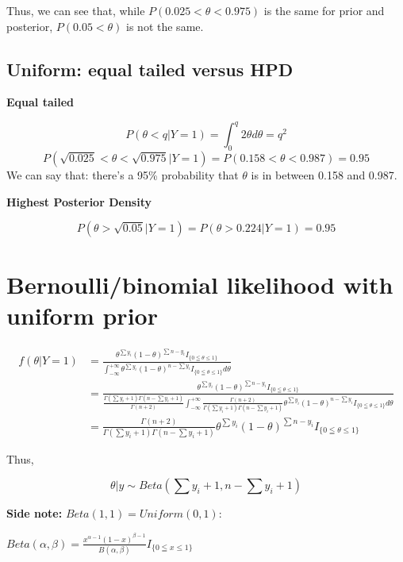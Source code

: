 \documentclass[
]{book}
\begin{document}
Thus, we can see that, while \(P(0.025<\theta<0.975)\) is the same for prior and posterior, \(P(0.05<\theta)\) is not the same.

\hypertarget{uniform-equal-tailed-versus-hpd}{%
\subsection{Uniform: equal tailed versus HPD}\label{uniform-equal-tailed-versus-hpd}}

\textbf{Equal tailed}

\[P(\theta < q|Y=1)=\int_0^q 2\theta d\theta=q^2\]
\[P(\sqrt{0.025}<\theta<\sqrt{0.975}|Y=1)=P(0.158<\theta<0.987)=0.95\]
We can say that: there's a 95\% probability that \(\theta\) is in between 0.158 and 0.987.

\textbf{Highest Posterior Density}

\[P(\theta > \sqrt{0.05}|Y=1)=P(\theta >0.224|Y=1)=0.95\]

\hypertarget{bernoullibinomial-likelihood-with-uniform-prior}{%
\section{Bernoulli/binomial likelihood with uniform prior}\label{bernoullibinomial-likelihood-with-uniform-prior}}

\[\begin{aligned}  f(\theta | Y=1) &= \frac{\theta^{\sum y_i}(1-\theta)^{\sum n-y_i} I_{\{0 \leqq \theta \leqslant 1\}}}{\int_{-\infty}^{+\infty} \theta^{\sum y_i}(1-\theta)^{n-\sum y_i} I_{\{0 \leqq \theta \leqslant 1\}} d\theta} \\ &=\frac{\theta^{\sum y_i}(1-\theta)^{\sum n-y_i} I_{\{0 \leqq \theta \leqslant 1\}}}{\frac{\Gamma(\sum y_i+1)\Gamma(n-\sum y_i+1)}{\Gamma(n+2)} \int_{-\infty}^{+\infty} \frac{\Gamma(n+2)}{\Gamma(\sum y_i+1)\Gamma(n-\sum y_i+1)} \theta^{\sum y_i}(1-\theta)^{n-\sum y_i} I_{\{0 \leqq \theta \leqslant 1\}} d\theta} \\ &= \frac{\Gamma(n+2)}{\Gamma(\sum y_i+1)\Gamma(n-\sum y_i+1)}\theta^{\sum y_i}(1-\theta)^{\sum n-y_i} I_{\{0 \leqq \theta \leqslant 1\}}  \end{aligned} \]

Thus,

\[\theta | y \sim Beta (\sum y_i+1, n-\sum y_i +1)\]

\textbf{Side note:}
\(Beta(1,1)=Uniform(0,1)\):

\(Beta(\alpha,\beta)=\frac{x^{\alpha-1}(1-x)^{\beta-1}}{B(\alpha,\beta)} I_{\{0 \leqq x \leqslant 1\}}\)
\end{document}
